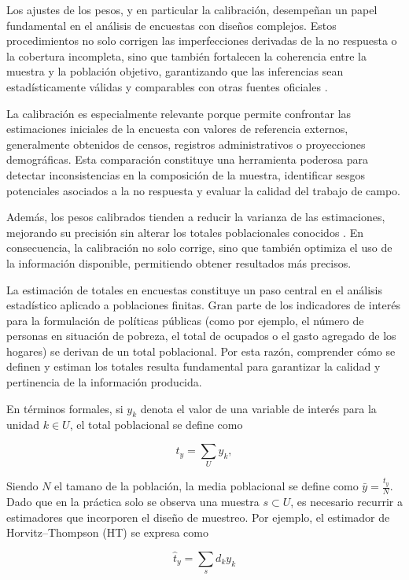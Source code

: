 \documentclass[
  spanish,
  12pt,
]{book}
\begin{document}
Los ajustes de los pesos, y en particular la calibración, desempeñan un papel fundamental en el análisis de encuestas con diseños complejos. Estos procedimientos no solo corrigen las imperfecciones derivadas de la no respuesta o la cobertura incompleta, sino que también fortalecen la coherencia entre la muestra y la población objetivo, garantizando que las inferencias sean estadísticamente válidas y comparables con otras fuentes oficiales \citep{kalton2003weighting}.

La calibración es especialmente relevante porque permite confrontar las estimaciones iniciales de la encuesta con valores de referencia externos, generalmente obtenidos de censos, registros administrativos o proyecciones demográficas. Esta comparación constituye una herramienta poderosa para detectar inconsistencias en la composición de la muestra, identificar sesgos potenciales asociados a la no respuesta y evaluar la calidad del trabajo de campo.

Además, los pesos calibrados tienden a reducir la varianza de las estimaciones, mejorando su precisión sin alterar los totales poblacionales conocidos \citep{sarndal2005nonresponse}. En consecuencia, la calibración no solo corrige, sino que también optimiza el uso de la información disponible, permitiendo obtener resultados más precisos.

La estimación de totales en encuestas constituye un paso central en el análisis estadístico aplicado a poblaciones finitas. Gran parte de los indicadores de interés para la formulación de políticas públicas (como por ejemplo, el número de personas en situación de pobreza, el total de ocupados o el gasto agregado de los hogares) se derivan de un total poblacional. Por esta razón, comprender cómo se definen y estiman los totales resulta fundamental para garantizar la calidad y pertinencia de la información producida.

En términos formales, si \(y_k\) denota el valor de una variable de interés para la unidad \(k \in U\), el total poblacional se define como

\[
t_y = \sum_{U} y_k,
\]

Siendo \(N\) el tamano de la población, la media poblacional se define como \(\bar{y} = \frac{t_y}{N}\). Dado que en la práctica solo se observa una muestra \(s \subset U\), es necesario recurrir a estimadores que incorporen el diseño de muestreo. Por ejemplo, el estimador de Horvitz--Thompson (HT) se expresa como

\[
\hat{t}_{y} = \sum_{s} d_k y_k
\]
\end{document}
